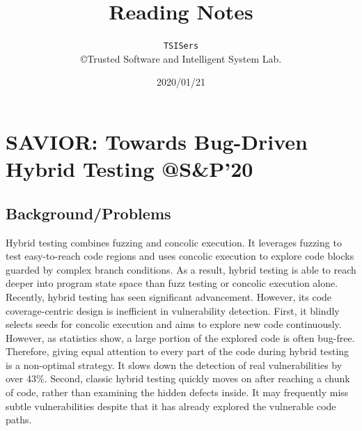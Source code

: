 

\title{\textbf{Reading Notes}}%
\author{\texttt{TSISers} 
    \\ \copyright Trusted Software and Intelligent System Lab.}
\date{2020/01/21}



\maketitle 
\tableofcontents
\clearpage



\section{SAVIOR: Towards Bug-Driven Hybrid Testing @S\&P'20
}

\subsection{Background/Problems}
Hybrid testing combines fuzzing and concolic execution. It leverages fuzzing to test easy-to-reach code regions and uses concolic execution to explore code blocks guarded by complex branch conditions. As a result, hybrid testing is able to reach deeper into program state space than fuzz testing or concolic execution alone. Recently, hybrid testing has seen significant advancement. However, {its code coverage-centric design is inefficient in vulnerability detection}. First, it {blindly} selects seeds for concolic execution and aims to explore new code continuously. However, as statistics show, a large portion of the explored code is often bug-free. Therefore, giving equal attention to every part of the code during hybrid testing is a non-optimal strategy. It slows down the detection of real vulnerabilities by over 43\%. Second, classic hybrid testing quickly moves on after reaching a chunk of code, rather than examining the hidden defects inside. It may frequently {miss subtle vulnerabilities} despite that it has already explored the vulnerable code paths.
